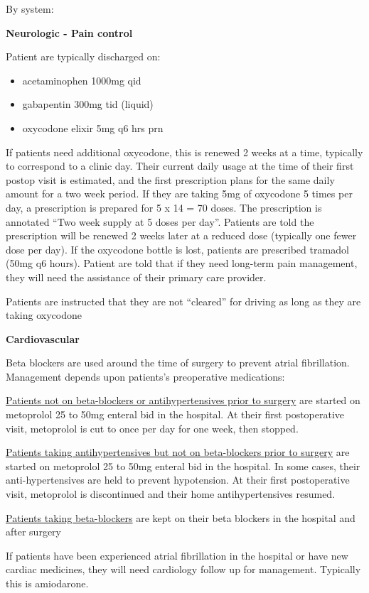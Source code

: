 \documentclass[
  letterpaper,
]{scrbook}
\providecommand{\tightlist}{%
  \setlength{\itemsep}{0pt}\setlength{\parskip}{0pt}}
\begin{document}
By system:

\textbf{Neurologic - Pain control}

Patient are typically discharged on:

\begin{itemize}
\tightlist
\item
  acetaminophen 1000mg qid
\item
  gabapentin 300mg tid (liquid)
\item
  oxycodone elixir 5mg q6 hrs prn
\end{itemize}

If patients need additional oxycodone, this is renewed 2 weeks at a
time, typically to correspond to a clinic day. Their current daily usage
at the time of their first postop visit is estimated, and the first
prescription plans for the same daily amount for a two week period. If
they are taking 5mg of oxycodone 5 times per day, a prescription is
prepared for 5 x 14 = 70 doses. The prescription is annotated ``Two week
supply at 5 doses per day''. Patients are told the prescription will be
renewed 2 weeks later at a reduced dose (typically one fewer dose per
day). If the oxycodone bottle is lost, patients are prescribed tramadol
(50mg q6 hours). Patient are told that if they need long-term pain
management, they will need the assistance of their primary care
provider.

Patients are instructed that they are not ``cleared'' for driving as
long as they are taking oxycodone

\textbf{Cardiovascular}

Beta blockers are used around the time of surgery to prevent atrial
fibrillation. Management depends upon patients's preoperative
medications:

\ul{Patients not on beta-blockers or antihypertensives prior to surgery}
are started on metoprolol 25 to 50mg enteral bid in the hospital. At
their first postoperative visit, metoprolol is cut to once per day for
one week, then stopped.

\ul{Patients taking antihypertensives but not on beta-blockers prior to
surgery} are started on metoprolol 25 to 50mg enteral bid in the
hospital. In some cases, their anti-hypertensives are held to prevent
hypotension. At their first postoperative visit, metoprolol is
discontinued and their home antihypertensives resumed.

\ul{Patients taking beta-blockers} are kept on their beta blockers in
the hospital and after surgery

If patients have been experienced atrial fibrillation in the hospital or
have new cardiac medicines, they will need cardiology follow up for
management. Typically this is amiodarone.
\end{document}
